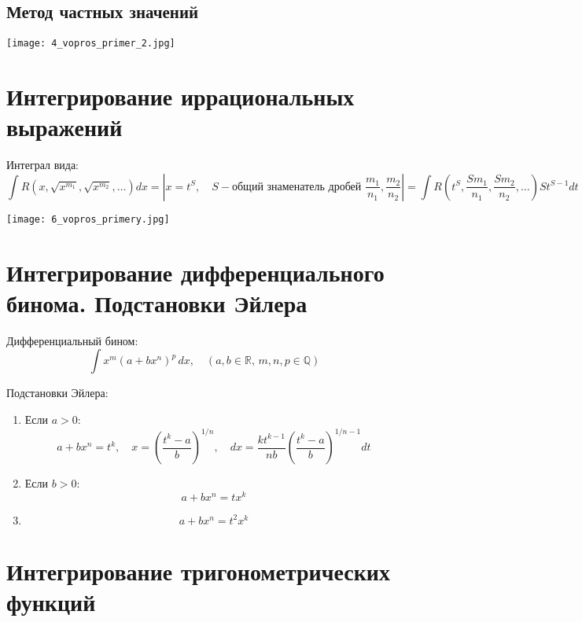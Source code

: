 \documentclass[a4paper,12pt]{article}
\begin{document}
\subsection{Метод частных значений}
\texttt{[image: 4\_vopros\_primer\_2.jpg]}

\section{Интегрирование иррациональных выражений}

Интеграл вида:
\[
\int R\left(x, \sqrt{x^{m_1}}, \sqrt{x^{m_2}}, \dots\right) dx = \left| x = t^S, \quad S - \text{общий знаменатель дробей } \frac{m_1}{n_1}, \frac{m_2}{n_2} \right| = \int R\left(t^S, \frac{Sm_1}{n_1}, \frac{Sm_2}{n_2}, \dots\right) S t^{S-1} dt
\]

\texttt{[image: 6\_vopros\_primery.jpg]}

\section{Интегрирование дифференциального бинома. Подстановки Эйлера}

Дифференциальный бином:
\[
\int x^m (a + b x^n)^p \, dx, \quad (a, b \in \mathbb{R}, \, m, n, p \in \mathbb{Q})
\]

Подстановки Эйлера:
\begin{enumerate}
    \item Если \( a > 0 \): \[
    a + b x^n = t^k, \quad x = \left( \frac{t^k - a}{b} \right)^{1/n}, \quad dx = \frac{k t^{k-1}}{n b} \left( \frac{t^k - a}{b} \right)^{1/n - 1} dt
    \]
    \item Если \( b > 0 \): \[
    a + b x^n = t x^k
    \]
    \item \[
    a + b x^n = t^2 x^k
    \]
\end{enumerate}

\section{Интегрирование тригонометрических функций}
\end{document}
